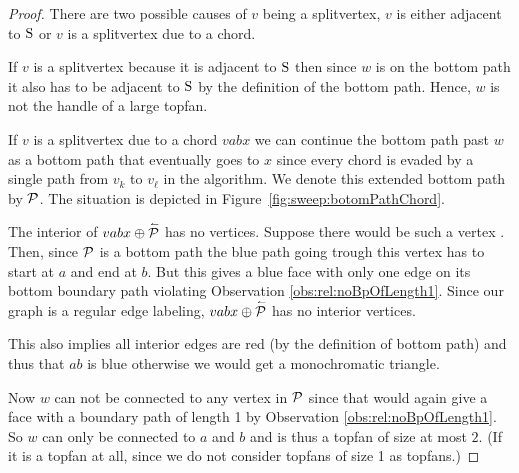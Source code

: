     \begin{proof}
      There are two possible causes of $v$ being a splitvertex, $v$ is either adjacent to $\pS$ or $v$ is a splitvertex due to a chord.

      If $v$ is a splitvertex because it is adjacent to $\pS$ then since $w$ is on the bottom path it also has to be adjacent to $\pS$ by the definition of the bottom path.
      Hence, $w$ is not the handle of a large topfan.

      If $v$ is a splitvertex due to a chord $v a b x$ we can continue the bottom path past $w$ as a bottom path that eventually goes to $x$ since every chord is evaded by a single path from $v_k$ to $v_\ell$ in the algorithm.
      We denote this extended bottom path by $\P$.
      The situation is depicted in Figure~\ref{fig:sweep:botomPathChord}.

      The interior of  $vabx \oplus \rev \P$ has no vertices. Suppose there would be such a vertex . Then, since $\P$ is a bottom path the blue path going trough this vertex has to start at $a$ and end at $b$. But this gives a blue face with only one edge on its bottom boundary path violating Observation \ref{obs:rel:noBpOfLength1}. Since our graph is a regular edge labeling, $vabx \oplus \rev \P$ has no interior vertices.

      This also implies all interior edges are red (by the definition of bottom path) and thus that $ab$ is blue otherwise we would get a monochromatic triangle.

      Now $w$ can not be connected to any vertex in $\P$ since that would again give a face with a boundary path of length 1 by Observation \ref{obs:rel:noBpOfLength1}.
      So $w$ can only be connected to $a$ and $b$ and is thus a topfan of size at most $2$.
      (If it is a topfan at all, since we do not consider topfans of size 1 as topfans.)
    \end{proof}

